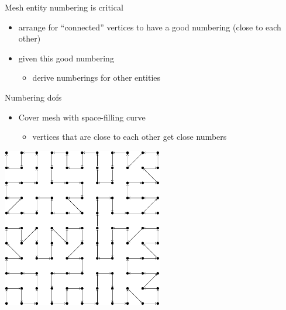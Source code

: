 \documentclass[presentation]{beamer}
\begin{document}
\begin{frame}[label={sec:orgheadline5}]{Mesh entity numbering is critical}
\begin{itemize}
\item arrange for ``connected'' vertices to have a good numbering (close to
each other)
\item given this good numbering
\begin{itemize}
\item derive numberings for other entities
\end{itemize}
\end{itemize}
\end{frame}

\begin{frame}[label={sec:orgheadline6}]{Numbering dofs}
\begin{itemize}
\item Cover mesh with space-filling curve
\begin{itemize}
\item vertices that are close to each other get close numbers
\end{itemize}
\end{itemize}

\begin{center}
\includegraphics[width=7cm]{03-18-FEniCS-mesh-numbering.figures/good-nodes}
\end{center}
\end{frame}
\end{document}

